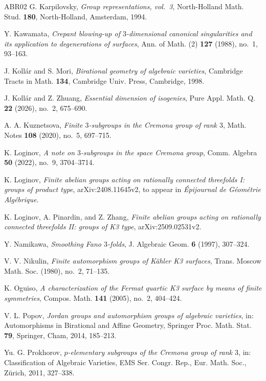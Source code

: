\documentclass[10pt,oneside,reqno]{amsart}
\numberwithin{equation}{section}
\theoremstyle{definition}
\begin{document}
\begin{thebibliography}{ABR02}
G. Karpilovsky,
\emph{Group representations, vol.~3},
North-Holland Math. Stud. \textbf{180},
North-Holland, Amsterdam, 1994.

Y. Kawamata,
\emph{Crepant blowing-up of $3$-dimensional canonical singularities
and its application to degenerations of surfaces},
Ann. of Math. (2) \textbf{127} (1988), no.~1, 93--163.


J. Koll{\'a}r and S. Mori,
\emph{Birational geometry of algebraic varieties},
Cambridge Tracts in Math. \textbf{134}, Cambridge Univ. Press,
Cambridge, 1998.

J. Koll\'{a}r and Z. Zhuang,
\emph{Essential dimension of isogenies},
Pure Appl. Math. Q. \textbf{22} (2026), no.~2, 675--690.

A. A. Kuznetsova,
\emph{Finite $3$-subgroups in the Cremona group of rank $3$},
Math. Notes \textbf{108} (2020), no.~5, 697--715.

K. Loginov,
\emph{A note on $3$-subgroups in the space Cremona group},
Comm. Algebra \textbf{50} (2022), no.~9, 3704--3714.

K. Loginov,
\emph{Finite abelian groups acting on rationally connected threefolds I:
groups of product type},
arXiv:2408.11645v2, to appear in
\emph{\'Epijournal de G\'eom\'etrie Alg\'ebrique}.

K. Loginov, A. Pinardin, and Z. Zhang,
\emph{Finite abelian groups acting on rationally connected threefolds II:
groups of K3 type},
arXiv:2509.02531v2.

Y. Namikawa,
\emph{Smoothing Fano $3$-folds},
J. Algebraic Geom. \textbf{6} (1997), 307--324.

V. V. Nikulin,
\emph{Finite automorphism groups of K\"ahler K3 surfaces},
Trans. Moscow Math. Soc. (1980), no.~2, 71--135.

K. Oguiso,
\emph{A characterization of the Fermat quartic K3 surface by means of
finite symmetries},
Compos. Math. \textbf{141} (2005), no.~2, 404--424.

V. L. Popov,
\emph{Jordan groups and automorphism groups of algebraic varieties},
in: Automorphisms in Birational and Affine Geometry,
Springer Proc. Math. Stat. \textbf{79},
Springer, Cham, 2014, 185--213.
  
Yu. G. Prokhorov,
\emph{$p$-elementary subgroups of the Cremona group of rank $3$},
in: Classification of Algebraic Varieties,
EMS Ser. Congr. Rep., Eur. Math. Soc., Z\"urich, 2011, 327--338.


\end{thebibliography}
\end{document}
